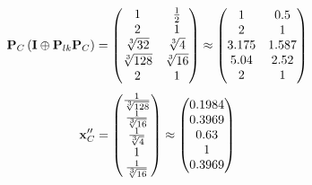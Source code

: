 \documentclass[10pt,a4paper]{article}
\begin{document}
	\[
		\bold{P}_{C}\left(\bold{I} \oplus \bold{P}_{lk}\bold{P}_{C}\right) = 
		\begin{pmatrix}
			{1} {} & \frac{1} {{2}} \\
			{{2}} {} & {1} {} \\
			{\sqrt[3]{32}} {} & {\sqrt[3]{4}} {} \\
			{\sqrt[3]{128}} {} & {\sqrt[3]{16}} {} \\
			{{2}} {} & {1} {} \\
		\end{pmatrix}
		\approx
		\begin{pmatrix}
			1        & 0.5      \\
			2        & 1        \\
			3.175    & 1.587    \\
			5.04     & 2.52     \\
			2        & 1        \\
		\end{pmatrix}
	\]
	\[
		\bold{x}''_{C} = 
		\begin{pmatrix}
			\frac{1} {\sqrt[3]{128}} \\
			\frac{1} {\sqrt[3]{16}} \\
			\frac{1} {\sqrt[3]{4}} \\
			{1} {} \\
			\frac{1} {\sqrt[3]{16}} \\
		\end{pmatrix}
		\approx
		\begin{pmatrix}
			0.1984   \\
			0.3969   \\
			0.63     \\
			1        \\
			0.3969   \\
		\end{pmatrix}
	\]
\end{document}
